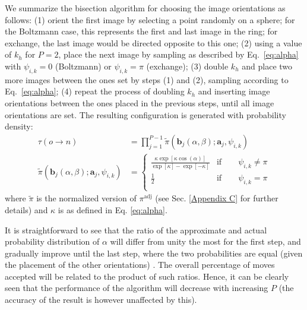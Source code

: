 We summarize the bisection algorithm for choosing the image orientations as follows: (1) orient the first image by selecting a point randomly on a sphere; for the Boltzmann case, this represents the first and last image in the ring; for exchange, the last image would be directed opposite to this one; (2) using a value of $k_h$ for $P = 2$, place the next image by sampling as described by Eq.~\ref{eq:alpha} with $\psi_{i,k} = 0$ (Boltzmann) or $\psi_{i,k} = \pi$ (exchange); (3) double $k_h$ and place two more images between the ones set by steps (1) and (2), sampling according to Eq.~\ref{eq:alpha}; (4) repeat the process of doubling $k_h$ and inserting image orientations between the ones placed in the previous steps, until all image orientations are set. The resulting configuration is generated with probability density:
        \begin{equation}
        \label{eq:piTilde}
            \begin{aligned}
                \tau (o \to n) &= \displaystyle\prod_{j=1}^{P-1} \tilde \pi({\mathbf b}_j (\alpha, \beta); {\mathbf a}_j, \psi_{i,k}) \\
                \tilde \pi({\mathbf b}_j (\alpha, \beta); {\mathbf a}_j, \psi_{i,k})  &=
                \begin{cases}
                    \displaystyle\frac{\kappa \exp[\kappa \cos (\alpha)]}{\exp[\kappa] - \exp[-\kappa]} & \text{if} \qquad \psi_{i,k} \ne \pi\\
                    \displaystyle\frac{1}{2} & \text{if} \qquad \psi_{i,k} = \pi\\
                \end{cases}
            \end{aligned}
        \end{equation}
        where $\tilde \pi$ is the normalized version of $\pi^\text{adj}$ (see Sec. \ref{Appendix C} for further details) and $\kappa$ is as defined in Eq. \eqref{eq:alpha}.

            It is straightforward to see that the ratio of the approximate and actual probability distribution of $\alpha$ will differ from unity the most for the first step, and gradually improve until the last step, where the two probabilities are equal (given the placement of the other orientations) . The overall percentage of moves accepted will be related to the product of such ratios. Hence, it can be clearly seen that the performance of the algorithm will decrease with increasing $P$ (the accuracy of the result is however unaffected by this).

